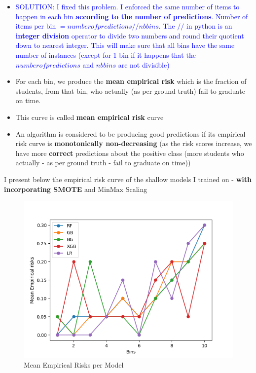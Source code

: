 \documentclass[11pt]{article}
\begin{document}
\begin{itemize}
\item \textcolor{blue}{SOLUTION: I fixed this problem. I enforced the same number of items to happen in each bin \textbf{according to the number of predictions}. Number of items per bin $= number of predictions // nb bins $. The $//$ in python is an \textbf{integer division} operator to divide two numbers and round their quotient down to nearest integer. This will make sure that all bins have the same number of instances (except for 1 bin if it happens that the $number of predictions$ and $nb bins$ are not divisible)}


\item For each bin, we produce the \textbf{mean empirical risk} which is the fraction of students, from that bin, who actually (as per ground truth) fail to graduate on time.
\item This curve is called \textbf{mean empirical risk} curve
\item An algorithm is considered to be producing good predictions if its empirical risk curve is \textbf{monotonically non-decreasing} (as the risk scores increase, we have more \textbf{correct} predictions about the positive class (more students who actually - as per ground truth - fail to graduate on time))
\end{itemize}

I present below the empirical risk curve of the shallow models I trained on - \textbf{with incorporating SMOTE} and MinMax Scaling
\begin{figure}[H]
\centering
\includegraphics[scale=0.5]{plots/toydata/meanempiricalrisks.png}
\caption{Mean Empirical Risks per Model}
\label{Fig:MeanEmpiricalRisks}
\end{figure}
\end{document}
